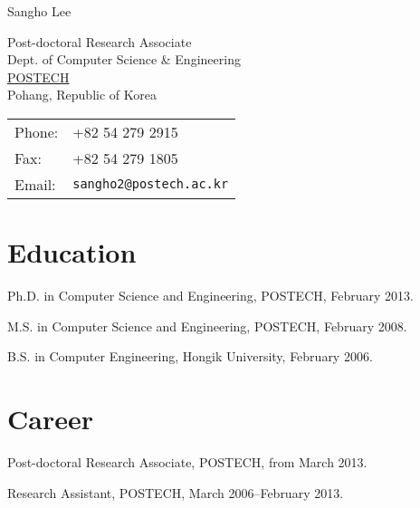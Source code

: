 \documentclass[letterpaper]{article}
\def\name{Sangho Lee}
\renewenvironment{itemize}{
  \begin{list}{}{
    \setlength{\leftmargin}{1.5em}
  }
}{
  \end{list}
}
\begin{document}
{\huge \name}


\vspace{0.25in}

\begin{minipage}{0.5\linewidth}
  Post-doctoral Research Associate \\
  Dept. of Computer Science \& Engineering \\
  \href{http://www.postech.ac.kr}{POSTECH} \\  
  Pohang, Republic of Korea
\end{minipage}
\begin{minipage}{0.5\linewidth}
  \begin{tabular}{ll}
    Phone:    & +82 54 279 2915 \\
    Fax:      & +82 54 279 1805 \\
    Email:    & {\tt sangho2@postech.ac.kr} \\
  \end{tabular}
\end{minipage}

\section*{Education}

\begin{itemize}
  \item Ph.D. in Computer Science and Engineering, POSTECH, February 2013.
  \item M.S. in Computer Science and Engineering, POSTECH, February 2008.
  \item B.S. in Computer Engineering, Hongik University, February 2006.
\end{itemize}

\section*{Career}
\begin{itemize}
  \item Post-doctoral Research Associate, POSTECH, from March 2013.
  \item Research Assistant, POSTECH, March 2006--February 2013.
\end{itemize}
\end{document}
